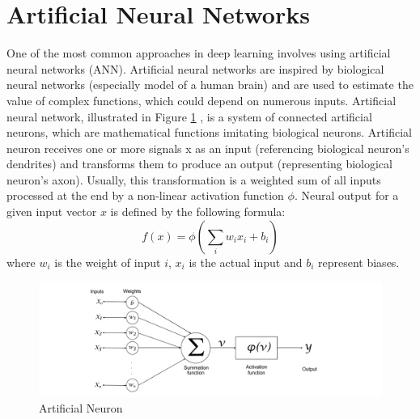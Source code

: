 \section{Artificial Neural Networks} \label{sec:3}
    One of the most common approaches in deep learning involves using artificial neural networks
    (ANN). Artificial neural networks are inspired by biological neural networks (especially model of
    a human brain) and are used to estimate the value of complex functions, which could depend on
    numerous inputs.
    Artificial neural network, illustrated in Figure \ref{fig:31} , is a system of connected artificial neurons,
    which are mathematical functions imitating biological neurons. Artificial neuron receives one
    or more signals x as an input (referencing biological neuron's dendrites) and transforms them
    to produce an output (representing biological neuron's axon). Usually, this transformation is a
    weighted sum of all inputs processed at the end by a non-linear activation function $\phi$. Neural
    output for a given input vector $x$ is defined by the following formula:
    \begin{equation} \label{eq:31}
        f(x)=\phi(\sum_i w_i x_i + b_i)
    \end{equation}
    where $w_i$ is the weight of input $i$, $x_i$ is the actual input and $b_i$ represent biases.
    \par
    \begin{figure}[H]
        \centering
        \includegraphics[scale=0.3]{images/aneuron.png}
        \caption{Artificial Neuron}
        \label{fig:31}
    \end{figure}
    
